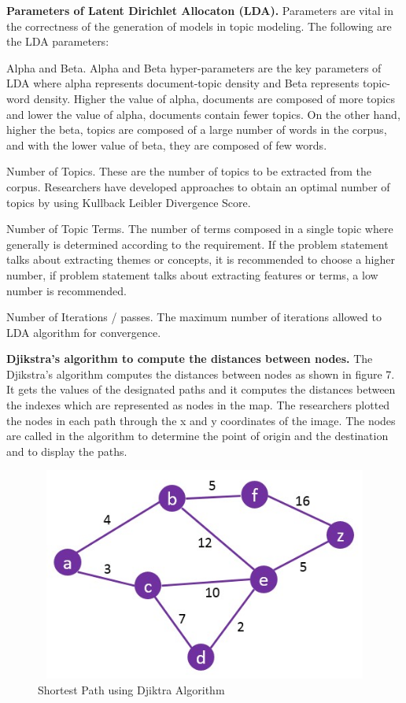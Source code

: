 \textbf{Parameters of Latent Dirichlet Allocaton (LDA).} Parameters are vital in the correctness of the generation of models in topic modeling. The following are the LDA parameters:

Alpha and Beta. Alpha and Beta hyper-parameters are the key parameters of LDA where alpha represents document-topic density and Beta represents topic-word density. Higher the value of alpha, documents are composed of more topics and lower the value of alpha, documents contain fewer topics. On the other hand, higher the beta, topics are composed of a large number of words in the corpus, and with the lower value of beta, they are composed of few words.

Number of Topics. These are the number of topics to be extracted from the corpus. Researchers have developed approaches to obtain an optimal number of topics by using Kullback Leibler Divergence Score.

Number of Topic Terms. The number of terms composed in a single topic where generally is determined according to the requirement. If the problem statement talks about extracting themes or concepts, it is recommended to choose a higher number, if problem statement talks about extracting features or terms, a low number is recommended.

Number of Iterations / passes. The maximum number of iterations allowed to LDA algorithm for convergence.
	
\textbf{Djikstra’s algorithm to compute the distances between nodes.} The Djikstra’s algorithm computes the distances between nodes as shown in figure 7. It gets the values of the designated paths and it computes the distances between the indexes which are represented as nodes in the map. The researchers plotted the nodes in each path through the x and y coordinates of the image. The nodes are called in the algorithm to determine the point of origin and the destination and to display the paths.

    \begin{figure}[H]
	\centering
	\includegraphics[width=12cm,height=7cm]{image/cs_figure7.jpg}
	\caption{Shortest Path using Djiktra Algorithm}
	\end{figure}

